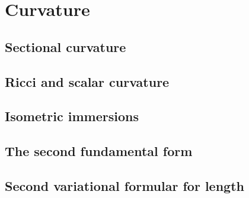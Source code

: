 \documentclass[letter-paper]{tufte-book}
\begin{document}
\chapter{Curvature}


\section{Sectional curvature}


\section{Ricci and scalar curvature}


\section{Isometric immersions}


\section{The second fundamental form}


\section{Second variational formular for length}










\mainmatter




%


\end{document}
